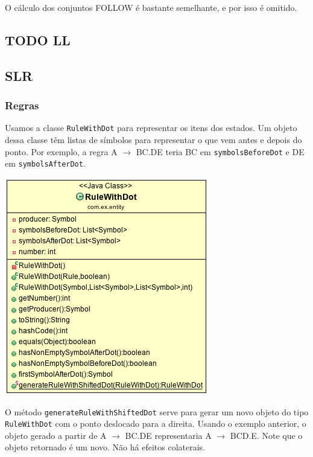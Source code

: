 \documentclass[11pt]{article}
\begin{document}
O cálculo dos conjuntos FOLLOW é bastante semelhante, e por isso é omitido.

\subsection{{\bfseries\sffamily TODO} LL}
\label{sec:orgheadline9}

\subsection{SLR}
\label{sec:orgheadline13}

\subsubsection{Regras}
\label{sec:orgheadline10}
Usamos a classe \texttt{RuleWithDot} para representar os itens dos estados.
Um objeto dessa classe têm listas de símbolos para representar o que vem antes e
depois do ponto. Por exemplo, a regra A \(\rightarrow\) BC.DE teria BC em
\texttt{symbolsBeforeDot} e DE em \texttt{symbolsAfterDot}.

\includegraphics[width=.9\linewidth]{./media/ruleWithDot.png}

O método \texttt{generateRuleWithShiftedDot} serve para gerar um novo objeto do tipo
\texttt{RuleWithDot} com o ponto deslocado para a direita. Usando o exemplo anterior, o
objeto gerado a partir de A \(\rightarrow\) BC.DE representaria A \(\rightarrow\) BCD.E.
Note que o objeto retornado é um novo. Não há efeitos colaterais.
\end{document}
